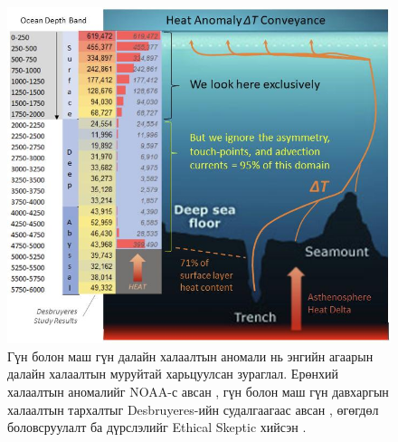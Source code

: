 \documentclass[10pt,twocolumn,letterpaper]{article}
\begin{document}
\begin{figure}[t]
\begin{center}
\includegraphics[width=1\textwidth]{deepsea.jpg}
\end{center}
   \caption{Гүн болон маш гүн далайн халаалтын аномали нь энгийн агаарын далайн халаалтын муруйтай харьцуулсан зураглал. Ерөнхий халаалтын аномалийг NOAA-с авсан \cite{147}, гүн болон маш гүн давхаргын халаалтын тархалтыг Desbruyeres-ийн судалгаагаас авсан \cite{132}, өгөгдөл боловсруулалт ба дүрслэлийг Ethical Skeptic хийсэн \cite{129}.}
\label{fig:21}
\end{figure}
\end{document}
